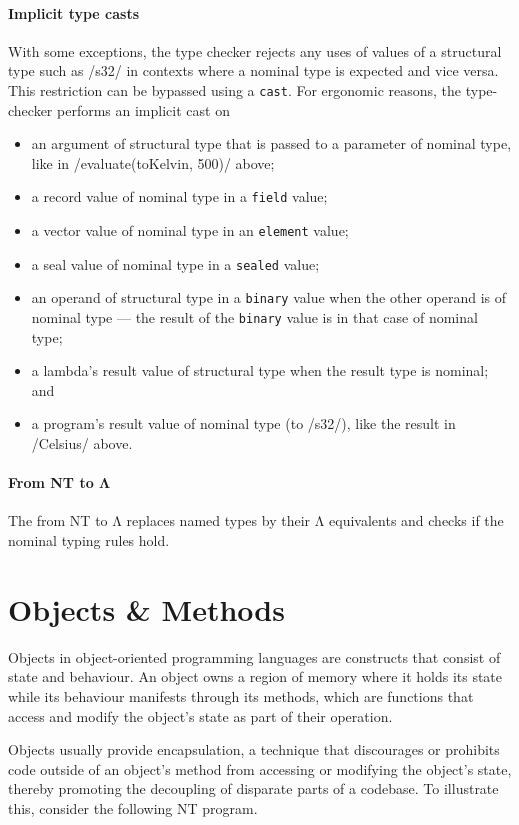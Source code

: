 \documentclass[main.tex]{subfiles}
\begin{document}
\paragraph{Implicit type casts} With some exceptions, the type checker rejects any uses of values of a structural type such as \iil/s32/ in contexts where a nominal type is expected and vice versa. This restriction can be bypassed using a \texttt{cast}. For ergonomic reasons, the type-checker performs an implicit cast on
\begin{itemize}[nosep]
	\item an argument of structural type that is passed to a parameter of nominal type, like in \iil/evaluate(toKelvin, 500)/ above;
	\item a record value of nominal type in a \texttt{field} value;
	\item a vector value of nominal type in an \texttt{element} value;
	\item a seal value of nominal type in a \texttt{sealed} value;
	\item an operand of structural type in a \texttt{binary} value when the other operand is of nominal type — the result of the \texttt{binary} value is in that case of nominal type;
	\item a lambda's result value of structural type when the result type is nominal; and
	\item a program's result value of nominal type (to \iil/s32/), like the result in \iil/Celsius/ above.
\end{itemize}

\paragraph{From NT to Λ} The  from NT to Λ replaces named types by their Λ equivalents and checks if the nominal typing rules hold.

\section{Objects \& Methods} \label{sct:obj-meth}
Objects in object-oriented programming languages are constructs that consist of state and behaviour. An object owns a region of memory where it holds its state while its behaviour manifests through its methods, which are functions that access and modify the object's state as part of their operation.

Objects usually provide encapsulation, a technique that discourages or prohibits code outside of an object's method from accessing or modifying the object's state, thereby promoting the decoupling of disparate parts of a codebase. To illustrate this, consider the following NT program.
\end{document}

